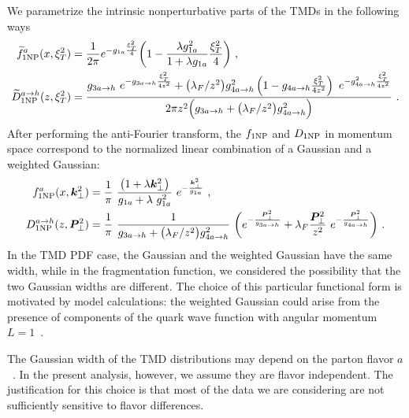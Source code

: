 \documentclass[aps,preprintnumbers,showpacs,nofootinbib,superscriptaddress,floatfix]{revtex4}
\newcommand{\T}{\perp}
\newcommand{\bT}{\xi_T}
\begin{document}
We parametrize the intrinsic nonperturbative parts of the TMDs in the
following ways
\begin{align}
\widetilde{f}_{1 {\rm NP}}^a (x, \bT^2) &= \frac{1}{2\pi}
        e^{-g_{1a} \frac{\bT^2}{4}}
        \bigg( 1 - \frac{\lambda  g_{1a}^{2}}{1+\lambda g_{1a}}  \frac{\bT^2}{4} \bigg)\  ,
\label{e:f1NP} \\
\widetilde{D}_{1 {\rm NP}}^{a \to h} (z, \bT^2) &= 
    \frac{ g_{3 a\to h} \   e^{-g_{3 a\to h} \frac{\bT^2}{4 z^2}}
        + \big(\lambda_F/z^2\big)    g_{4 a\to h}^{2}
    \left(1 - g_{4 a\to h} \frac{\bT^2}{4 z^2} \right)
         \  e^{- g_{4 a\to h}^{2}  \frac{\bT^2}{4z^2}}}
     {2 \pi z^2 \Big(g_{3 a\to h} + \big(\lambda_F/z^2\big)    g_{4 a\to h}^{2}\Big)} \  .
\label{e:D1NP}
\end{align} 
After performing the anti-Fourier transform, the $f_{1 \rm NP}$ and $D_{1\rm
  NP}$ in momentum space correspond to the normalized linear combination of
a Gaussian and a weighted Gaussian:
\begin{align} 
f_{1 {\rm NP}}^a (x, \bm{k}_{\T}^2) &= \frac{1}{\pi} \  
                        \frac{\big( 1 +\lambda \bm{k}_{\T}^2\big)}
                                { g_{1a} +\lambda \   g_{1a}^2}
                        \  e^{- \frac{\bm{k}_{\T}^2}{g_{1a}}} \  ,
\label{e:f1NPk}   \\
D_{1 {\rm NP}}^{a\to h} (z, \bm{P}_{\T}^2) &=  \frac{1}{\pi} \   
                  \frac{1}{g_{3 a\to h} +
                    \big(\lambda_F/z^2\big) g_{4 a \to h}^{2}}
           \   \bigg( e^{- \frac{\bm{P}_{\T}^2}{g_{3 a \to h}}}
                            + \lambda_F \frac{\bm{P}_{\T}^2}{z^2} \  
           e^{- \frac{\bm{P}_{\T}^2}{g_{4 a \to h}}} \bigg) \  .
\label{e:D1NPk}
\end{align} 
In the TMD PDF case, the Gaussian and the
weighted Gaussian have the same width, while in the fragmentation function, we
considered the possibility that the two Gaussian widths are different. 
The choice of this particular functional form is motivated by model
calculations: the weighted Gaussian could arise from 
the presence of components of the quark wave function 
with angular momentum
$L=1$~\cite{Bacchetta:2007wc,Pasquini:2008ax,Avakian:2010br,Bacchetta:2010si,Burkardt:2015qoa}.   

The
Gaussian width of the TMD distributions may depend 
on the parton flavor $a$~\cite{Signori:2013mda}. 
In the present analysis, however, we assume they are
flavor independent. The justification for this choice is that most of the data
we are considering are not sufficiently sensitive to flavor differences.
\end{document}
